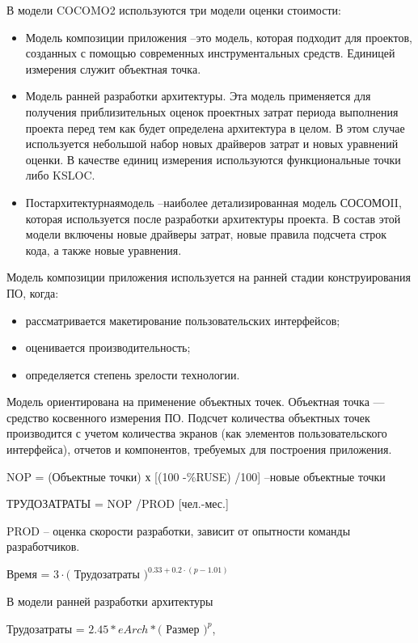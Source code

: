 \documentclass[a4paper,14pt]{article}
\begin{document}
В модели COCOMO2 используются три модели оценки стоимости:

\begin{itemize}
    \item Модель композиции приложения –это модель, которая подходит для проектов, созданных с помощью современных инструментальных средств. Единицей измерения служит объектная точка.
    \item Модель ранней разработки архитектуры. Эта модель применяется для получения приблизительных оценок проектных затрат периода выполнения проекта перед тем как будет определена архитектура в целом. В этом случае используется небольшой набор новых драйверов затрат и новых уравнений оценки. В качестве единиц измерения используются функциональные точки либо KSLOC.
    \item Постархитектурнаямодель –наиболее детализированная модель СОСОМОII, которая используется после разработки архитектуры проекта. В состав этой модели включены новые драйверы затрат, новые правила подсчета строк кода, а также новые уравнения.
\end{itemize}

Модель композиции приложения используется на ранней стадии конструирования ПО, когда:

\begin{itemize}
    \item рассматривается макетирование пользовательских интерфейсов;
    \item оценивается производительность;
    \item определяется степень зрелости технологии.
\end{itemize}

Модель ориентирована на применение объектных точек. Объектная точка — средство косвенного измерения ПО. Подсчет количества объектных точек производится с учетом количества экранов (как элементов пользовательского интерфейса), отчетов и компонентов, требуемых для построения приложения.

NOP = (Объектные точки) х [(100 -\%RUSE) /100] –новые объектные точки

ТРУДОЗАТРАТЫ = NOP /PROD [чел.-мес.]

PROD -- оценка скорости разработки, зависит от опытности команды разработчиков.

Время = $3 \cdot ($ Трудозатраты $)^{0.33 + 0.2 \cdot (p - 1.01)}$

В модели ранней разработки архитектуры

Трудозатраты = $2.45*eArch*($ Размер $)^{p}$,
\end{document}

